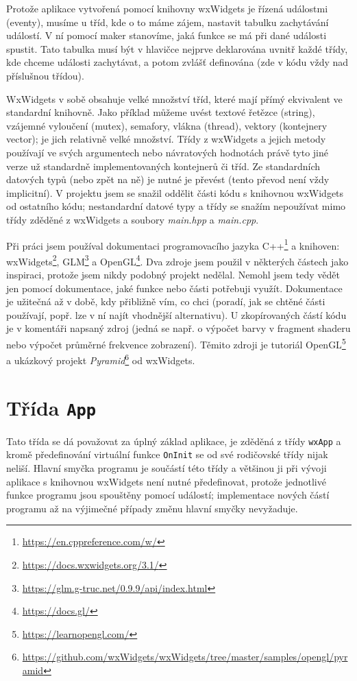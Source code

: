 \documentclass[a4paper, 11pt]{report}
\begin{document}
Protože aplikace vytvořená pomocí knihovny wxWidgets je řízená událostmi (eventy), musíme u tříd, kde o to máme zájem, nastavit tabulku zachytávání událostí. V ní pomocí maker stanovíme, jaká funkce se má při dané události spustit. Tato tabulka musí být v hlavičce nejprve deklarována uvnitř každé třídy, kde chceme události zachytávat, a potom zvlášť definována (zde v kódu vždy nad příslušnou třídou).

WxWidgets v sobě obsahuje velké množství tříd, které mají přímý ekvivalent ve standardní knihovně. Jako příklad můžeme uvést textové řetězce (string), vzájemné vyloučení (mutex), semafory, vlákna (thread), vektory (kontejnery vector); je jich relativně velké množství. Třídy z wxWidgets a jejich metody používají ve svých argumentech nebo návratových hodnotách právě tyto jiné verze už standardně implementovaných kontejnerů či tříd. Ze standardních datových typů (nebo zpět na ně) je nutné je převést (tento převod není vždy implicitní). V projektu jsem se snažil oddělit části kódu s knihovnou wxWidgets od ostatního kódu; nestandardní datové typy a třídy se snažím nepoužívat mimo třídy zděděné z wxWidgets a soubory \emph{main.hpp} a \emph{main.cpp}.

Při práci jsem používal dokumentaci programovacího jazyka C++\footnote{\url{https://en.cppreference.com/w/}} a knihoven: wxWidgets\footnote{\url{https://docs.wxwidgets.org/3.1/}}, GLM\footnote{\url{https://glm.g-truc.net/0.9.9/api/index.html}} a OpenGL\footnote{\url{https://docs.gl/}}. Dva zdroje jsem použil v některých částech jako inspiraci, protože jsem nikdy podobný projekt nedělal. Nemohl jsem tedy vědět jen pomocí dokumentace, jaké funkce nebo části potřebuji využít. Dokumentace je užitečná až v době, kdy přibližně vím, co chci (poradí, jak se chtěné části používají, popř. lze v ní najít vhodnější alternativu). U zkopírovaných částí kódu je v komentáři napsaný zdroj (jedná se např. o výpočet barvy v fragment shaderu nebo výpočet průměrné frekvence zobrazení). Těmito zdroji je tutoriál OpenGL\footnote{\url{https://learnopengl.com/}} a ukázkový projekt \emph{Pyramid}\footnote{\url{https://github.com/wxWidgets/wxWidgets/tree/master/samples/opengl/pyramid}} od wxWidgets.

\section{Třída \texttt{App}}
Tato třída se dá považovat za úplný základ aplikace, je zděděná z třídy \texttt{wxApp} a kromě předefinování virtuální funkce \texttt{OnInit} se od své rodičovské třídy nijak neliší. Hlavní smyčka programu je součástí této třídy a většinou ji při vývoji aplikace s knihovnou wxWidgets není nutné předefinovat, protože jednotlivé funkce programu jsou spouštěny pomocí událostí; implementace nových částí programu až na výjimečné případy změnu hlavní smyčky nevyžaduje.
\end{document}
